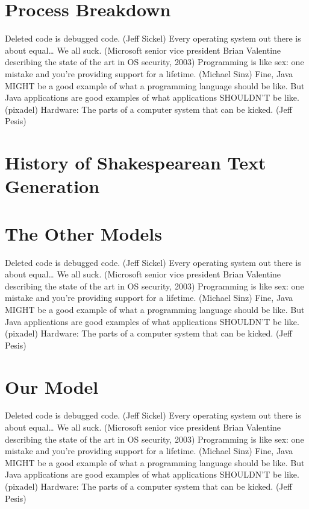 \documentclass[11pt,a4paper]{article}
\begin{document}
\section{Process Breakdown}

Deleted code is debugged code. (Jeff Sickel) Every operating system out there is about equal… We all suck. (Microsoft senior vice president Brian Valentine describing the state of the art in OS security, 2003) Programming is like sex: one mistake and you’re providing support for a lifetime. (Michael Sinz) Fine, Java MIGHT be a good example of what a programming language should be like. But Java applications are good examples of what applications SHOULDN’T be like. (pixadel) Hardware: The parts of a computer system that can be kicked. (Jeff Pesis)

\section{History of Shakespearean Text Generation}
\label{sec:length}



\section{The Other Models}

Deleted code is debugged code. (Jeff Sickel) Every operating system out there is about equal… We all suck. (Microsoft senior vice president Brian Valentine describing the state of the art in OS security, 2003) Programming is like sex: one mistake and you’re providing support for a lifetime. (Michael Sinz) Fine, Java MIGHT be a good example of what a programming language should be like. But Java applications are good examples of what applications SHOULDN’T be like. (pixadel) Hardware: The parts of a computer system that can be kicked. (Jeff Pesis)

\section{Our Model}

Deleted code is debugged code. (Jeff Sickel) Every operating system out there is about equal… We all suck. (Microsoft senior vice president Brian Valentine describing the state of the art in OS security, 2003) Programming is like sex: one mistake and you’re providing support for a lifetime. (Michael Sinz) Fine, Java MIGHT be a good example of what a programming language should be like. But Java applications are good examples of what applications SHOULDN’T be like. (pixadel) Hardware: The parts of a computer system that can be kicked. (Jeff Pesis)
\end{document}
